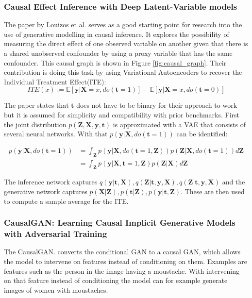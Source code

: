 \documentclass{article}
\newcommand{\bt}{\mathbf{t}}
\newcommand{\bX}{\mathbf{X}}
\newcommand{\by}{\mathbf{y}}
\newcommand{\bZ}{\mathbf{Z}}
\begin{document}
\subsubsection*{Causal Effect Inference with Deep Latent-Variable models}
The paper by Louizos et al.\cite{louizos2017causal} serves as a good starting point for research into the use of generative modelling in causal inference. It explores the possibility of measuring the direct effect of one observed variable on another given that there is a shared unobserved confounder by using a proxy variable that has the same confounder. This causal graph is shown in Figure \ref{fig:causal_graph}. Their contribution is doing this task by using Variational Autoencoders\cite{kingma2013auto} to recover the Individual Treatment Effect(ITE):
\begin{equation}\label{equation:ITE}
    ITE(x) := \mathbb{E}[\by | \bX = x, do(\bt = 1)] - \mathbb{E}[\by | \bX = x, do(\bt=0)]
\end{equation}

\noindent
The paper states that $\bt$ does not have to be binary for their approach to work but it is assumed for simplicity and compatibility with prior benchmarks. First the joint distribution $p(\bZ, \bX, \by, \bt)$ is approximated with a VAE that consists of several neural networks. With that $p(\by | \bX, do(\bt=1))$ can be identified:

\begin{equation}\label{equation:intervention}
    \begin{split}
    p(\by | \bX, do(\bt=1)) &= \int_\bZ p(\by | \bX, do(\bt=1, \bZ)) p(\bZ | \bX, do(\bt = 1)) d\bZ \\
                            &= \int_\bZ p(\by | \bX, \bt = 1, \bZ) p(\bZ | \bX) d\bZ
    \end{split}
\end{equation}

\noindent
The inference network captures $q(\by | \bt , \bX), q(\bZ | \bt, \by, \bX), q(\bZ| \bt, \by, \bX)$ and the generative network captures $p(\bX | \bZ), p(\bt | \bZ), p(\by | \bt, \bZ)$. These are then used to compute a sample average for the ITE.



\subsubsection*{CausalGAN: Learning Causal Implicit Generative Models with Adversarial Training}
The CausalGAN\cite{kocaoglu2017causalgan}. converts the conditional GAN to a causal GAN, which allows the model to intervene on features instead of conditioning on them. Examples are features such as the person in the image having a moustache. With intervening on that feature instead of conditioning the model can for example generate images of women with moustaches.
\end{document}
